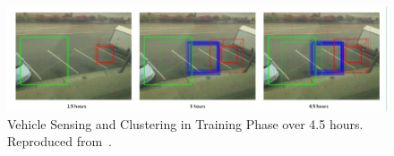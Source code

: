 \begin{figure}[hbt!]
  \centering
  \includegraphics[width=\textwidth]{image/lit/ling2017.png}
  \caption[Vehicle Sensing and Clustering in Training Phase over 4.5 hours.] {Vehicle Sensing and Clustering in Training Phase over 4.5 hours. Reproduced from~\cite{ling2017identifying}.}
\label{fig:ling2017}
\end{figure}


